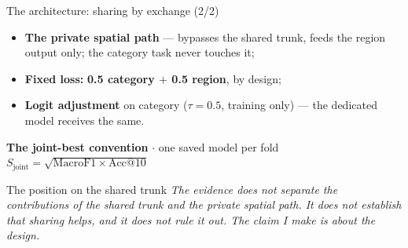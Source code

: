 \documentclass{beamer}
\begin{document}
\begin{frame}{The architecture: sharing by exchange (2/2)}
    \begin{itemize}
        \item \textbf{The private spatial path} --- bypasses the shared
              trunk, feeds the region output only; \alert{the category task never touches it};
        \item \textbf{Fixed loss:} \textbf{0.5 category $+$ 0.5 region}, by design;
        \item \textbf{Logit adjustment} on category ($\tau = 0.5$, training only) ---
              \alert{the dedicated model receives the same}.
    \end{itemize}

    \medskip
    {\centering\textbf{The joint-best convention} $\cdot$ one saved model per fold\\[0.8ex]
    $S_{\mathrm{joint}} = \sqrt{\mathrm{MacroF1} \times \mathrm{Acc@10}}$\par}

    \medskip
    \begin{alertblock}{The position on the shared trunk}
        \small
        \emph{The evidence does not separate the contributions of the shared trunk and the private
        spatial path. It does not establish that sharing helps, and it does not rule it out.
        The claim I make is about the design.}
    \end{alertblock}
\end{frame}
\end{document}
